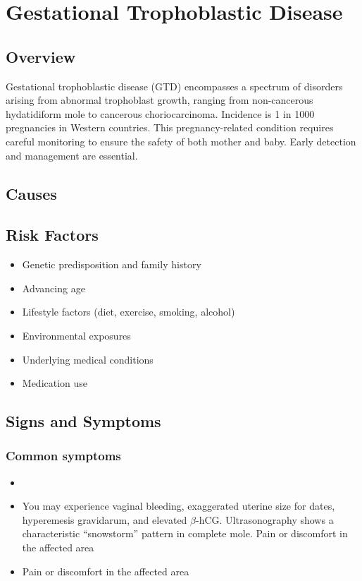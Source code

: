 \chapter{Gestational Trophoblastic Disease}
\label{sec:Gestational Trophoblastic Disease}

\section{Overview}
Gestational trophoblastic disease (GTD) encompasses a spectrum of disorders arising from abnormal trophoblast growth, ranging from non-cancerous hydatidiform mole to cancerous choriocarcinoma. Incidence is 1 in 1000 pregnancies in Western countries. This pregnancy-related condition requires careful monitoring to ensure the safety of both mother and baby. Early detection and management are essential.
\section{Causes}
\section{Risk Factors}

\begin{itemize}[noitemsep]
  \item Genetic predisposition and family history
  \item Advancing age
  \item Lifestyle factors (diet, exercise, smoking, alcohol)
  \item Environmental exposures
  \item Underlying medical conditions
  \item Medication use
\end{itemize}
\section{Signs and Symptoms}

\subsection{Common symptoms}
\begin{itemize}[noitemsep]
  \item \item You may experience vaginal bleeding, exaggerated uterine size for dates, hyperemesis gravidarum, and elevated $\beta$-hCG. Ultrasonography shows a characteristic ``snowstorm'' pattern in complete mole. Pain or discomfort in the affected area    \item Pain or discomfort in the affected area
  \end{itemize}

